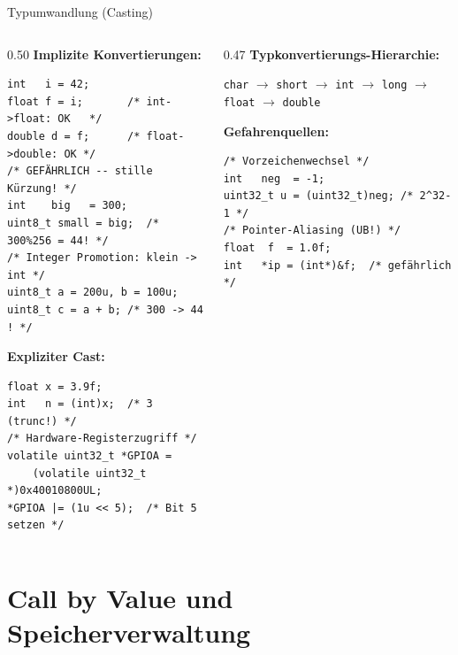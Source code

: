 \documentclass[%
  aspectratio=169,
  10pt
]{beamer}
\begin{document}
\begin{frame}[fragile]{Typumwandlung (Casting)}
  \begin{columns}[T]
    \begin{column}{0.50\textwidth}
      \textbf{Implizite Konvertierungen:}
\begin{lstlisting}
int   i = 42;
float f = i;       /* int->float: OK   */
double d = f;      /* float->double: OK */
/* GEFÄHRLICH -- stille Kürzung! */
int    big   = 300;
uint8_t small = big;  /* 300%256 = 44! */
/* Integer Promotion: klein -> int */
uint8_t a = 200u, b = 100u;
uint8_t c = a + b; /* 300 -> 44 ! */
\end{lstlisting}
      \textbf{Expliziter Cast:}
\begin{lstlisting}
float x = 3.9f;
int   n = (int)x;  /* 3 (trunc!) */
/* Hardware-Registerzugriff */
volatile uint32_t *GPIOA =
    (volatile uint32_t *)0x40010800UL;
*GPIOA |= (1u << 5);  /* Bit 5 setzen */
\end{lstlisting}
    \end{column}
    \begin{column}{0.47\textwidth}
      \textbf{Typkonvertierungs-Hierarchie:}
      \begin{center}
        \small
        \texttt{char} $\to$ \texttt{short} $\to$ \texttt{int}
        $\to$ \texttt{long} $\to$ \texttt{float} $\to$ \texttt{double}
      \end{center}

      \vspace{0.3em}
      \textbf{Gefahrenquellen:}
\begin{lstlisting}
/* Vorzeichenwechsel */
int   neg  = -1;
uint32_t u = (uint32_t)neg; /* 2^32-1 */
/* Pointer-Aliasing (UB!) */
float  f  = 1.0f;
int   *ip = (int*)&f;  /* gefährlich */


\end{lstlisting}
    \end{column}
  \end{columns}
\end{frame}

\section{Call by Value und Speicherverwaltung}
\end{document}
